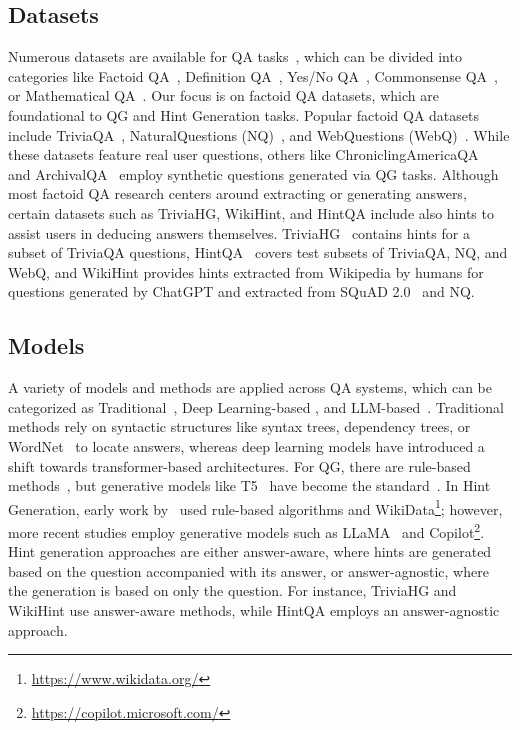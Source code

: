 \subsection{Datasets} \label{ss:related_work_dataset}
Numerous datasets are available for QA tasks~\cite{reddy-etal-2019-coqa, clark-etal-2020-tydi, yang-etal-2018-hotpotqa}, which can be divided into categories like Factoid QA~\cite{rajpurkar-etal-2018-know}, Definition QA~\cite{2015arXiv150602075B}, Yes/No QA~\cite{clark-etal-2019-boolq}, Commonsense QA~\cite{talmor-etal-2019-commonsenseqa}, or Mathematical QA~\cite{amini-etal-2019-mathqa}. Our focus is on factoid QA datasets, which are foundational to QG and Hint Generation tasks. Popular factoid QA datasets include TriviaQA~\cite{joshi-etal-2017-triviaqa}, NaturalQuestions (NQ)~\cite{kwiatkowski-etal-2019-natural}, and WebQuestions (WebQ)~\cite{berant-etal-2013-semantic}. While these datasets feature real user questions, others like ChroniclingAmericaQA~\cite{10.1145/3626772.3657891} and ArchivalQA~\cite{10.1145/3477495.3531734} employ synthetic questions generated via QG tasks. Although most factoid QA research centers around extracting or generating answers, certain datasets such as TriviaHG, WikiHint, and HintQA include also hints to assist users in deducing answers themselves. TriviaHG~\cite{mozafari-triviahg} contains hints for a subset of TriviaQA questions, HintQA~\cite{mozafari-hintqa} covers test subsets of TriviaQA, NQ, and WebQ, and WikiHint\cite{2024arXiv241201626M} provides hints extracted from Wikipedia by humans for questions generated by ChatGPT and extracted from SQuAD 2.0~\cite{rajpurkar-etal-2018-know} and NQ.

\subsection{Models} \label{ss:related_work_model}
A variety of models and methods are applied across QA systems, which can be categorized as Traditional~\cite{punyakanok2004natural}, Deep Learning-based \cite{10.1007/s00521-021-06748-3}, and LLM-based~\cite{2024arXiv240214320Z}. Traditional methods rely on syntactic structures like syntax trees, dependency trees, or WordNet~\cite{fernando2008semantic} to locate answers, whereas deep learning models have introduced a shift towards transformer-based architectures. For QG, there are rule-based methods~\cite{7732102}, but generative models like T5~\cite{10.5555/3455716.3455856} have become the standard~\cite{2020arXiv200501107E, yuan-etal-2023-selecting}. In Hint Generation, early work by~\citet{jatowt_kg_hint} used rule-based algorithms and WikiData\footnote{\url{https://www.wikidata.org/}}; however, more recent studies employ generative models such as LLaMA~\cite{2024arXiv240721783D} and Copilot\footnote{\url{https://copilot.microsoft.com/}}. Hint generation approaches are either answer-aware, where hints are generated based on the question accompanied with its answer, or answer-agnostic, where the generation is based on only the question. For instance, TriviaHG and WikiHint use answer-aware methods, while HintQA employs an answer-agnostic approach.

